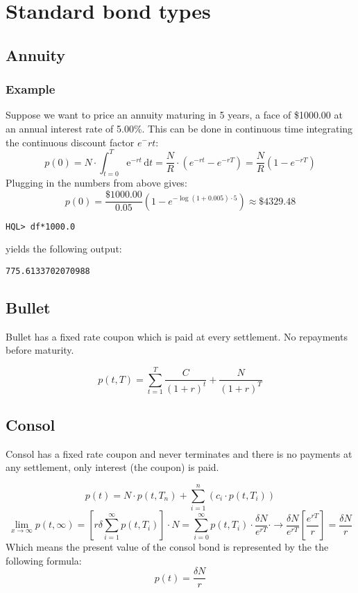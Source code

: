 \documentclass[11pt,a4paper]{article}
\numberwithin{equation}{section}
\begin{document}
\section{Standard bond types}
\subsection{Annuity}
\subsubsection{Example}
Suppose we want to price an annuity maturing in 5 years, a face of \$1000.00 at an annual interest rate of 5.00\%.
This can be done in continuous time integrating the continuous discount factor $e^-rt$:
\[
p(0)=N\cdot \int_{t=0}^T \mathrm{e}^{-rt}\,\mathrm{d}t=\frac{N}{R}\cdot (e^{-rt}-e^{-rT})=\frac{N}{R}(1-e^{-rT})
\]
Plugging in the numbers from above gives:
\[
p(0)=\frac{\$1000.00}{0.05}(1-e^{-\log(1+0.005)\cdot 5})\approx \$4329.48
\]
\begin{lstlisting}
HQL> df*1000.0
\end{lstlisting}
yields the following output:
\FrameSep
\begin{lstlisting}[style=Output]
775.6133702070988
\end{lstlisting}

\subsection{Bullet}
Bullet has a fixed rate coupon which is paid at every settlement. No repayments before maturity.

\[ p(t,T) = \sum_{t=1}^{T}\frac{C}{(1+r)^t} + \frac{N}{(1+r)^T} \]

\subsection{Consol}
Consol has a fixed rate coupon and never terminates and there is no payments at any settlement,
only interest (the coupon) is paid.

\[
p(t) = N \cdot p(t,T_n)+\sum_{i=1}^{n} (c_i \cdot p(t,T_i))
\]
\[
\lim_{x \to \infty} p(t,\infty)=\left[r\delta\sum_{i=1}^{\infty} p(t,T_i)\right]\cdot N = 
\sum_{i=0}^{\infty} p(t,T_i) \cdot \frac{\delta N}{e^{rT}} \cdot \to \frac{\delta N}{e^{rT}}\left[ \frac{e^{rT}}{r}\right] = \frac{\delta N}{r}
\]
Which means the present value of the consol bond is represented by the the following formula:
\[
p(t) = \frac{\delta N}{r}
\]
\end{document}
